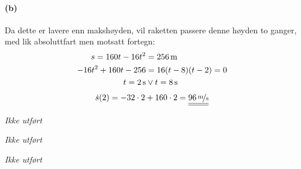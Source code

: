 \documentclass[a4paper,norsk,12pt]{article}
\begin{document}
\paragraph{(b)}
Da dette er lavere enn makshøyden, vil raketten passere denne høyden to ganger,
med lik absoluttfart men motsatt fortegn:
\begin{equation*}
  \begin{split}
    s  = 160t-16t^2 & = \unit[256]{m} \\
    -16t^2+160t-256 & = 16(t-8)(t-2) = 0 \\
    t = \unit[2]{s} & \vee t = \unit[8]{s}
  \end{split}
\end{equation*}
\begin{equation*}
  \begin{split}
    \dot{s}(2) = -32\cdot2 + 160\cdot2 = \svar{\unitfrac[96]{m}{s}}
  \end{split}
\end{equation*}

\textit{Ikke utført}

\textit{Ikke utført}

\textit{Ikke utført}
\end{document}
